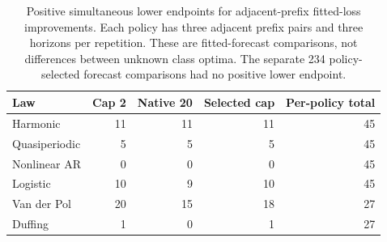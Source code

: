 \begin{table}[t]
\centering\small
\begin{tabular}{@{}lrrrr@{}}
\toprule
Law & Cap 2 & Native 20 & Selected cap & Per-policy total \\
\midrule
Harmonic & 11 & 11 & 11 & 45 \\
Quasiperiodic & 5 & 5 & 5 & 45 \\
Nonlinear AR & 0 & 0 & 0 & 45 \\
Logistic & 10 & 9 & 10 & 45 \\
Van der Pol & 20 & 15 & 18 & 27 \\
Duffing & 1 & 0 & 1 & 27 \\
\bottomrule
\end{tabular}
\caption{Positive simultaneous lower endpoints for adjacent-prefix
fitted-loss improvements. Each policy has three adjacent prefix pairs
and three horizons per repetition. These are fitted-forecast comparisons,
not differences between unknown class optima. The separate 234
policy-selected forecast comparisons had no positive lower endpoint.}
\label{tab:dimension-policy-improvements}
\end{table}
